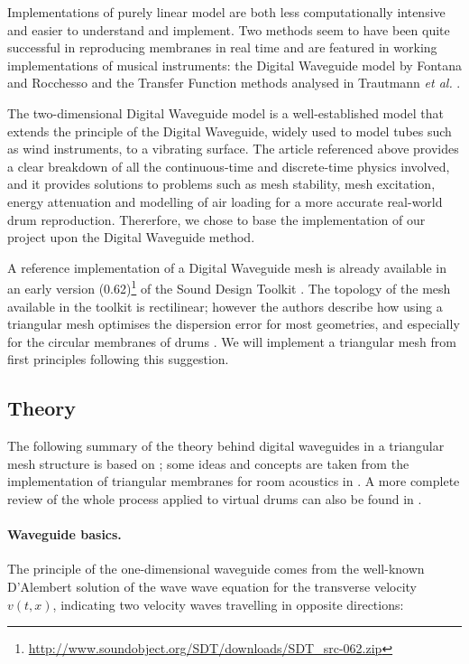 \documentclass{article}
\begin{document}
Implementations of purely linear model are both less computationally
intensive and easier to understand and implement. Two methods
seem to have been quite successful in reproducing membranes in
real time and are featured in working implementations of musical
instruments: the Digital Waveguide model by Fontana and Rocchesso
\cite{fontana1998physical} and the Transfer Function methods
analysed in Trautmann \emph{et al.} \cite{trautmann2001physical}.

The two-dimensional Digital Waveguide model is a well-established
model that extends the principle of the Digital Waveguide,
widely used to model tubes such as wind instruments, to a vibrating
surface.
The article referenced above provides a clear breakdown
of all the continuous-time and discrete-time physics involved,
and it provides solutions to problems such as mesh stability,
mesh excitation, energy attenuation and modelling of air loading
for a more accurate real-world drum reproduction.
Thererfore, we chose to base the implementation of our project upon
the Digital Waveguide method.

A reference implementation of a Digital Waveguide mesh is already
available in an early version
(0.62)\footnote{\url{http://www.soundobject.org/SDT/downloads/SDT_src-062.zip}}
of the Sound Design Toolkit \cite{baldan2017sound}.
The topology of the mesh available in the toolkit is rectilinear;
however the authors describe how using a triangular mesh
optimises the dispersion error for most geometries, and especially
for the circular membranes of drums \cite{fontana1998physical}.
We will implement a triangular mesh
from first principles following this
suggestion. 

\subsection{Theory}

The following summary of the theory behind digital waveguides in
a triangular mesh structure is based on \cite{fontana1998physical};
some ideas and concepts are taken from the implementation of
triangular membranes for room acoustics in \cite{murphy2000digital}.
A more complete review of the whole process applied to virtual drums
can also be found in \cite{laird2001physical}.

\paragraph{Waveguide basics.}
The principle of the one-dimensional waveguide comes from the well-known
D'Alembert solution of the
wave wave equation for the transverse velocity \(v(t, x)\),
indicating two velocity waves travelling in opposite
directions:
\end{document}
